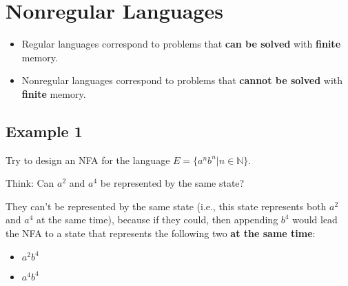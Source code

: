\documentclass[12pt, letterpaper, oneside]{book}
\begin{document}
%
%

\chapter{Nonregular Languages}

\begin{itemize}
  \item Regular languages correspond to problems that \textbf{can be solved} with \textbf{finite} memory.
  \item Nonregular languages correspond to problems that \textbf{cannot be solved} with \textbf{finite} memory.
\end{itemize}

\section{Example 1} \label{automata:nonregexp:example1}

Try to design an NFA for the language $E = \{ a^nb^n | n \in \mathbb{N} \}$.

Think: Can $a^2$ and $a^4$ be represented by the same state?


They can't be represented by the same state (i.e., this state represents both $a^2$ and $a^4$ at the same time),
because if they could, then appending $b^4$ would lead the NFA to a state that represents the following two \textbf{at
  the same time}:
\begin{itemize}
  \item $a^2b^4$
  \item $a^4b^4$
\end{itemize}
\end{document}
